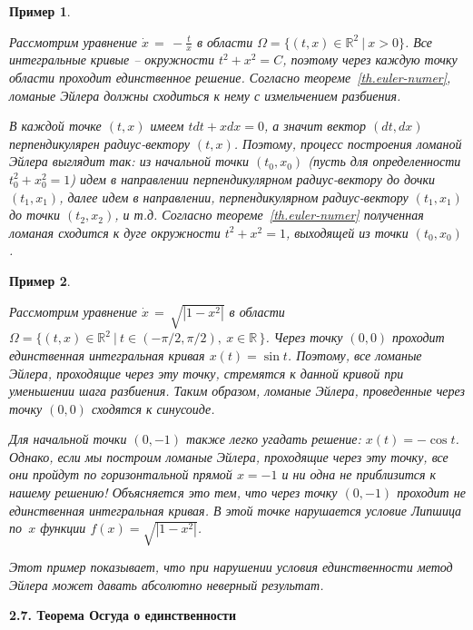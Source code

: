 \documentclass[12pt,a4paper]{article}
\newtheorem{ex}{Пример}
\newcommand{\re}{{\mathbb R}}
\begin{document}
\begin{ex}\label{ex.circle}
{\em Рассмотрим уравнение $\dot x \, = \, - \frac{t}{x}$ в области $\Omega = \{(t, x) \in \re^2 \ | \ x > 0\}$.
Все интегральные кривые -- окружности  $t^2 + x^2 = C$, поэтому через каждую точку области проходит единственное решение.
Согласно теореме~\ref{th.euler-numer}, ломаные Эйлера должны сходиться к нему с измельчением разбиения.

В каждой точке $(t, x)$ имеем $t dt + x d x = 0$, а значит вектор $(d t , d x)$ перпендикулярен радиус-вектору
$(t, x)$. Поэтому, процесс построения ломаной Эйлера выглядит так: из начальной точки $(t_0, x_0)$ (пусть для определенности $t_0^2 + x_0^2 = 1$) идем в направлении
перпендикулярном радиус-вектору до дочки $(t_1, x_1)$, далее идем в направлении, перпендикулярном
радиус-вектору $(t_1, x_1)$ до точки $(t_2, x_2)$, и т.д. Согласно теореме~\ref{th.euler-numer}
полученная ломаная сходится к дуге окружности $t^2 + x^2 = 1$, выходящей из точки $(t_0, x_0)$.

}
\end{ex}
\begin{ex}\label{ex.sinus}
{\em Рассмотрим уравнение $\dot x \, = \, \sqrt{|1-x^2|}$ в области
$\Omega = \{(t, x) \in \re^2 \ | \ t \in (-\pi/2, \pi/2), \ x \in \re\, \}$.
Через точку $(0, 0)$ проходит единственная интегральная кривая $x(t) = \sin t$.
Поэтому, все ломаные Эйлера, проходящие через эту точку, стремятся к данной кривой при
уменьшении шага разбиения. Таким образом, ломаные Эйлера, проведенные через точку $(0, 0)$
сходятся к синусоиде. 

Для начальной точки $(0, -1)$  также легко угадать решение: $x(t) = -\cos t$. 
Однако, если мы построим ломаные Эйлера, проходящие через эту точку, все они 
пройдут по горизонтальной прямой $x = -1$ и ни одна не приблизится к нашему решению! 
 Объясняется это тем, что
через точку $(0, -1)$ проходит не единственная интегральная кривая. В этой точке нарушается условие Липшица по~$x$ функции $f(x) = \sqrt{|1-x^2|}$. 

Этот пример показывает, что при нарушении условия единственности метод Эйлера может давать 
абсолютно неверный результат. 
}
\end{ex}
\bigskip


\medskip

\begin{center}
\textbf{2.7. Теорема Осгуда о единственности}
\end{center}
\medskip
\end{document}
